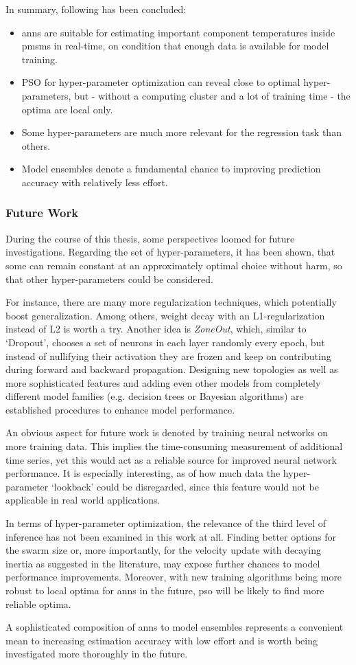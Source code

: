 In summary, following has been concluded:
\begin{itemize}
	\item \glspl{ann} are suitable for estimating important component temperatures inside \glspl{pmsm} in real-time, on condition that enough data is available for model training.
	\item PSO for hyper-parameter optimization can reveal close to optimal hyper-parameters, but - without a computing cluster and a lot of training time - the optima are local only.
	\item Some hyper-parameters are much more relevant for the regression task than others.
	\item Model ensembles denote a fundamental chance to improving prediction accuracy with relatively less effort. 
\end{itemize}

\subsubsection{Future Work}

During the course of this thesis, some perspectives loomed for future investigations.
Regarding the set of hyper-parameters, it has been shown, that some can remain constant at an approximately optimal choice without harm, so that other hyper-parameters could be considered.

For instance, there are many more regularization techniques, which potentially boost generalization.
Among others, weight decay with an L1-regularization instead of L2 is worth a try.
Another idea is \textit{ZoneOut}, which, similar to `Dropout', chooses a set of neurons in each layer randomly every epoch, but instead of nullifying their activation they are frozen and keep on contributing during forward and backward propagation.
Designing new topologies as well as more sophisticated features and adding even other models from completely different model families (e.g. decision trees or Bayesian algorithms) are established procedures to enhance model performance.

An obvious aspect for future work is denoted by training neural networks on more training data.
This implies the time-consuming measurement of additional time series, yet this would act as a reliable source for improved neural network performance. 
It is especially interesting, as of how much data the hyper-parameter `lookback' could be disregarded, since this feature would not be applicable in real world applications.

In terms of hyper-parameter optimization, the relevance of the third level of inference has not been examined in this work at all.
Finding better options for the swarm size or, more importantly, for the velocity update with decaying inertia as suggested in the literature, may expose further chances to model performance improvements.
Moreover, with new training algorithms being more robust to local optima for \glspl{ann} in the future, \gls{pso} will be likely to find more reliable optima.

A sophisticated composition of \glspl{ann} to model ensembles represents a convenient mean to increasing estimation accuracy with low effort and is worth being investigated more thoroughly in the future.